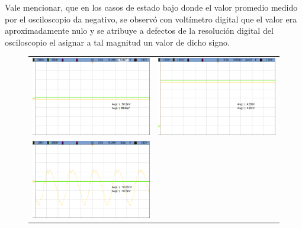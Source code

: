 Vale mencionar, que en los casos de estado bajo donde el valor promedio medido por el osciloscopio da negativo, se observ\'o con volt\'imetro digital que el valor era aproximadamente nulo y se atribuye
a defectos de la resoluci\'on digital del osciloscopio el asignar a tal magnitud un valor de dicho signo.

\begin{figure}[H]
    \centering
    \begin{tabular}{c c}
        \includegraphics[scale=0.2]{../EJ5/Mediciones/Osciloscopio/CMOS_OR_SOLA/cropped_entrada_estado_bajo.png} &
        \includegraphics[scale=0.2]{../EJ5/Mediciones/Osciloscopio/CMOS_OR_SOLA/cropped_entrada_estado_alto.png} \\
        \includegraphics[scale=0.2]{../EJ5/Mediciones/Osciloscopio/CMOS_OR_SOLA/cropped_entrada_al_aire.png} &

\end{tabular}
\end{figure}
